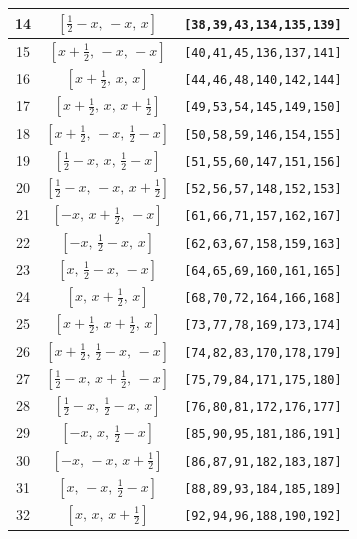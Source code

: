 \documentclass[fleqn,8pt]{jsarticle}
\begin{document}
\begin{longtable}{ccc}
14 & $\left[ \frac{1}{2} - x,\, - x,\, x \right]$ & {\tt [38,39,43,134,135,139]} \\ \hline
15 & $\left[ x + \frac{1}{2},\, - x,\, - x \right]$ & {\tt [40,41,45,136,137,141]} \\ \hline
16 & $\left[ x + \frac{1}{2},\, x,\, x \right]$ & {\tt [44,46,48,140,142,144]} \\ \hline
17 & $\left[ x + \frac{1}{2},\, x,\, x + \frac{1}{2} \right]$ & {\tt [49,53,54,145,149,150]} \\ \hline
18 & $\left[ x + \frac{1}{2},\, - x,\, \frac{1}{2} - x \right]$ & {\tt [50,58,59,146,154,155]} \\ \hline
19 & $\left[ \frac{1}{2} - x,\, x,\, \frac{1}{2} - x \right]$ & {\tt [51,55,60,147,151,156]} \\ \hline
20 & $\left[ \frac{1}{2} - x,\, - x,\, x + \frac{1}{2} \right]$ & {\tt [52,56,57,148,152,153]} \\ \hline
21 & $\left[ - x,\, x + \frac{1}{2},\, - x \right]$ & {\tt [61,66,71,157,162,167]} \\ \hline
22 & $\left[ - x,\, \frac{1}{2} - x,\, x \right]$ & {\tt [62,63,67,158,159,163]} \\ \hline
23 & $\left[ x,\, \frac{1}{2} - x,\, - x \right]$ & {\tt [64,65,69,160,161,165]} \\ \hline
24 & $\left[ x,\, x + \frac{1}{2},\, x \right]$ & {\tt [68,70,72,164,166,168]} \\ \hline
25 & $\left[ x + \frac{1}{2},\, x + \frac{1}{2},\, x \right]$ & {\tt [73,77,78,169,173,174]} \\ \hline
26 & $\left[ x + \frac{1}{2},\, \frac{1}{2} - x,\, - x \right]$ & {\tt [74,82,83,170,178,179]} \\ \hline
27 & $\left[ \frac{1}{2} - x,\, x + \frac{1}{2},\, - x \right]$ & {\tt [75,79,84,171,175,180]} \\ \hline
28 & $\left[ \frac{1}{2} - x,\, \frac{1}{2} - x,\, x \right]$ & {\tt [76,80,81,172,176,177]} \\ \hline
29 & $\left[ - x,\, x,\, \frac{1}{2} - x \right]$ & {\tt [85,90,95,181,186,191]} \\ \hline
30 & $\left[ - x,\, - x,\, x + \frac{1}{2} \right]$ & {\tt [86,87,91,182,183,187]} \\ \hline
31 & $\left[ x,\, - x,\, \frac{1}{2} - x \right]$ & {\tt [88,89,93,184,185,189]} \\ \hline
32 & $\left[ x,\, x,\, x + \frac{1}{2} \right]$ & {\tt [92,94,96,188,190,192]} \\
\end{longtable}
\end{document}
